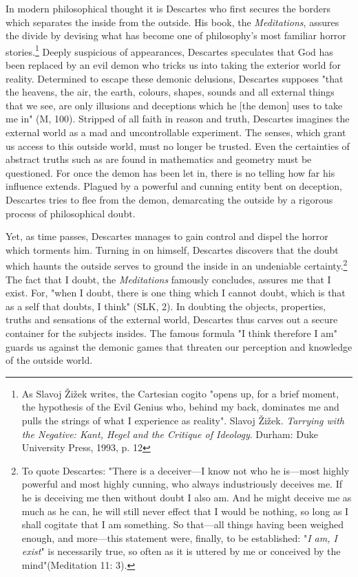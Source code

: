 In modern philosophical thought it is Descartes who first secures the borders which separates the inside from the outside. His book, the \textit{ Meditations}, assures the divide by devising what has become one of philosophy's most familiar horror stories.\footnote{As Slavoj Žižek writes, the Cartesian cogito "opens up, for a brief moment, the hypothesis of the Evil Genius who, behind my back, dominates me and pulls the strings of what I experience as reality". Slavoj Žižek. \textit{Tarrying with the Negative: Kant, Hegel and the Critique of Ideology}. Durham: Duke University Press, 1993, p. 12} Deeply suspicious of appearances, Descartes speculates that God has been replaced by an evil demon who tricks us into taking the exterior world for reality. Determined to escape these demonic delusions, Descartes supposes "that the heavens, the air, the earth, colours, shapes, sounds and all external things that we see, are only illusions and deceptions which he [the demon] uses to take me in" (M, 100). Stripped of all faith in reason and truth, Descartes imagines the external world as a mad and uncontrollable experiment. The senses, which grant us access to this outside world, must no longer be trusted. Even the certainties of abstract truths such as are found in mathematics and geometry must be questioned. For once the demon has been let in, there is no telling how far his influence extends. Plagued by a powerful and cunning entity bent on deception, Descartes tries to flee from the demon, demarcating the outside by a rigorous process of philosophical doubt.

Yet, as time passes, Descartes manages to gain control and dispel the horror which torments him. Turning in on himself, Descartes discovers that the doubt which haunts the outside serves to ground the inside in an undeniable certainty.\footnote{To quote Descartes: "There is a deceiver---I know not who he is---most highly powerful and most highly cunning, who always industriously deceives me. If he is deceiving me then without doubt I also am. And he might deceive me as much as he can, he will still never effect that I would be nothing, so long as I shall cogitate that I am something. So that---all things having been weighed enough, and more---this statement were, finally, to be established: "\textit{I am, I exist}" is necessarily true, so often as it is uttered by me or conceived by the mind"(Meditation 11: 3).} The fact that I doubt, the \textit{Meditations} famously concludes, assures me that I exist. For, "when I doubt, there is one thing which I cannot doubt, which is that as a self that doubts, I think" (SLK, 2). In doubting the objects, properties, truths and sensations of the external world, Descartes thus carves out a secure container for the subjects insides. The famous formula "I think therefore I am" guards us against the demonic games that threaten our perception and knowledge of the outside world.

